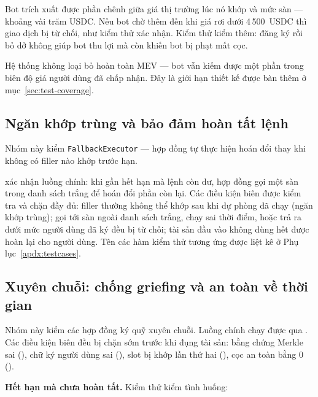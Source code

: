 \documentclass[../DoAn.tex]{subfiles}
\begin{document}
Bot trích xuất được phần chênh giữa giá thị trường lúc nó khớp và mức sàn --- khoảng vài trăm USDC. Nếu bot chờ thêm đến khi giá rơi dưới 4\,500~USDC thì giao dịch bị từ chối, như kiểm thử  xác nhận. Kiểm thử  kiểm thêm: đăng ký rồi bỏ dở không giúp bot thu lợi mà còn khiến bot bị phạt mất cọc.

Hệ thống không loại bỏ hoàn toàn MEV --- bot vẫn kiếm được một phần trong biên độ giá người dùng đã chấp nhận. Đây là giới hạn thiết kế được bàn thêm ở mục~\ref{sec:test-coverage}.

\subsection{Ngăn khớp trùng và bảo đảm hoàn tất lệnh}

Nhóm này kiểm \texttt{FallbackExecutor} --- hợp đồng tự thực hiện hoán đổi thay khi không có filler nào khớp trước hạn.

 xác nhận luồng chính: khi gần hết hạn mà lệnh còn dư, hợp đồng gọi một sàn trong danh sách trắng để hoán đổi phần còn lại. Các điều kiện biên được kiểm tra và chặn đầy đủ: filler thường không thể khớp sau khi dự phòng đã chạy (ngăn khớp trùng); gọi tới sàn ngoài danh sách trắng, chạy sai thời điểm, hoặc trả ra dưới mức người dùng đã ký đều bị từ chối; tài sản đầu vào không dùng hết được hoàn lại cho người dùng. Tên các hàm kiểm thử tương ứng được liệt kê ở Phụ lục~\ref{apdx:testcases}.

\subsection{Xuyên chuỗi: chống griefing và an toàn về thời gian}

Nhóm này kiểm các hợp đồng ký quỹ xuyên chuỗi. Luồng chính chạy được qua . Các điều kiện biên đều bị chặn sớm trước khi đụng tài sản: bằng chứng Merkle sai (), chữ ký người dùng sai (), slot bị khớp lần thứ hai (), cọc an toàn bằng 0 ().

\textbf{Hết hạn mà chưa hoàn tất.} Kiểm thử  kiểm tình huống:
\end{document}
